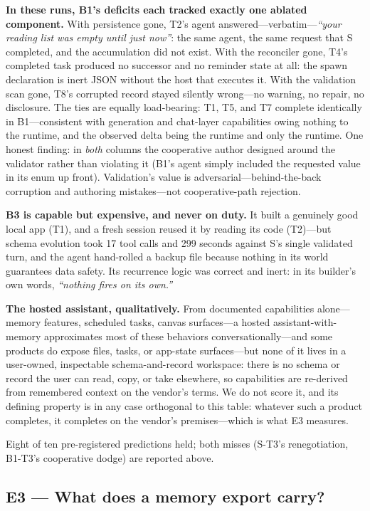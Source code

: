 \documentclass[11pt]{article}
\begin{document}
\textbf{In these runs, B1's deficits each tracked exactly one ablated component.}
With persistence gone, T2's agent answered---verbatim---\emph{``your reading list
was empty until just now''}: the same agent, the same request that S completed,
and the accumulation did not exist. With the reconciler gone, T4's completed task
produced no successor and no reminder state at all: the spawn declaration is
inert JSON without the host that executes it. With the validation scan gone, T8's
corrupted record stayed silently wrong---no warning, no repair, no disclosure.
The ties are equally load-bearing: T1, T5, and T7 complete identically in
B1---consistent with generation and chat-layer capabilities owing nothing to the
runtime, and the observed delta being the runtime and only the runtime. One
honest finding: in \emph{both} columns the cooperative author designed around the
validator rather than violating it (B1's agent simply included the requested
value in its enum up front). Validation's value is
adversarial---behind-the-back corruption and authoring mistakes---not
cooperative-path rejection.

\textbf{B3 is capable but expensive, and never on duty.} It built a genuinely
good local app (T1), and a fresh session reused it by reading its code (T2)---but
schema evolution took 17 tool calls and 299 seconds against S's single validated
turn, and the agent hand-rolled a backup file because nothing in its world
guarantees data safety. Its recurrence logic was correct and inert: in its
builder's own words, \emph{``nothing fires on its own.''}

\textbf{The hosted assistant, qualitatively.} From documented capabilities
alone---memory features, scheduled tasks, canvas surfaces---a hosted
assistant-with-memory approximates most of these behaviors conversationally---and
some products do expose files, tasks, or app-state surfaces---but none of it
lives in a user-owned, inspectable schema-and-record workspace: there is no
schema or record the user can read, copy, or take elsewhere, so capabilities are
re-derived from remembered context on the vendor's terms. We do not score it, and
its defining property is in any case orthogonal to this table: whatever such a
product completes, it completes on the vendor's premises---which is what E3
measures.

Eight of ten pre-registered predictions held; both misses (S-T3's renegotiation,
B1-T3's cooperative dodge) are reported above.

\subsection{E3 --- What does a memory export carry?}
\label{sec:e3}
\end{document}
